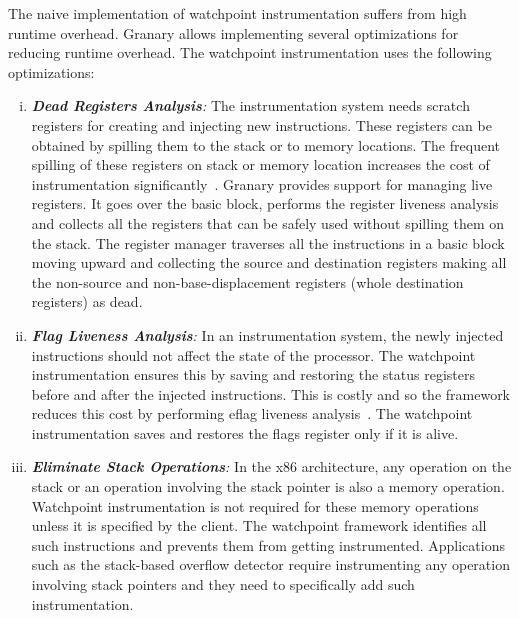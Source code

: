 The naive implementation of watchpoint instrumentation suffers from high runtime overhead. Granary allows implementing several optimizations for reducing runtime overhead. The watchpoint instrumentation uses the following optimizations:
\begin{enumerate}[i)]
	\item \emph{\textbf{Dead Registers Analysis}:} The instrumentation system needs scratch registers for creating and injecting new instructions. These registers can be obtained by spilling them to the stack or to memory locations. The frequent spilling of these registers on stack or memory location increases the cost of instrumentation significantly~\cite{Probst02registerliveness, Muth98registerliveness}. Granary provides support for managing live registers. It goes over the basic block, performs the register liveness analysis and collects all the registers that can be safely used without spilling them on the stack. The register manager traverses all the instructions in a basic block moving upward and collecting the source and destination registers making all the non-source and non-base-displacement registers (whole destination registers) as dead.

	\item \emph{\textbf{Flag Liveness Analysis}:} In an instrumentation system, the newly injected instructions should not affect the state of the processor. The watchpoint instrumentation ensures this by saving and restoring the status registers before and after the injected instructions. This is costly and so the framework reduces this cost by performing eflag liveness analysis~\cite{Dynst2011}. The watchpoint instrumentation saves and restores the flags register only if it is alive.

	\item \emph{\textbf{Eliminate Stack Operations}:} In the x86 architecture, any operation on the stack or an operation involving the stack pointer is also a memory operation. Watchpoint instrumentation is not required for these memory operations unless it is specified by the client. The watchpoint framework identifies all such instructions and prevents them from getting instrumented. 	Applications such as the stack-based overflow detector require instrumenting any operation involving stack pointers and they need to specifically add such instrumentation. 
\end{enumerate}

